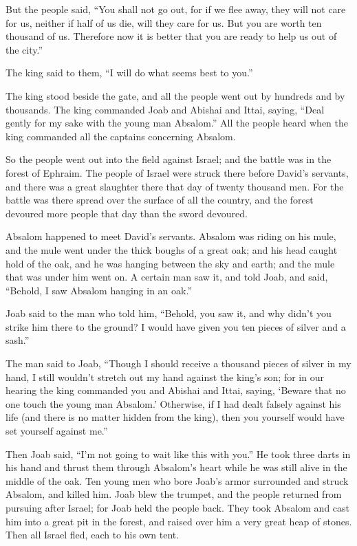  But the people said, ``You shall not go out, for if we flee
away, they will not care for us, neither if half of us die, will they
care for us. But you are worth ten thousand of us. Therefore now it is
better that you are ready to help us out of the city.''

 The king said to them, ``I will do what seems best to
you.''

The king stood beside the gate, and all the people went out by hundreds
and by thousands.  The king commanded Joab and Abishai and
Ittai, saying, ``Deal gently for my sake with the young man Absalom.''
All the people heard when the king commanded all the captains concerning
Absalom.

 So the people went out into the field against Israel; and
the battle was in the forest of Ephraim.  The people of
Israel were struck there before David's servants, and there was a great
slaughter there that day of twenty thousand men.  For the
battle was there spread over the surface of all the country, and the
forest devoured more people that day than the sword devoured.

 Absalom happened to meet David's servants. Absalom was
riding on his mule, and the mule went under the thick boughs of a great
oak; and his head caught hold of the oak, and he was hanging between the
sky and earth; and the mule that was under him went on.  A
certain man saw it, and told Joab, and said, ``Behold, I saw Absalom
hanging in an oak.''

 Joab said to the man who told him, ``Behold, you saw it,
and why didn't you strike him there to the ground? I would have given
you ten pieces of silver and a sash.''

 The man said to Joab, ``Though I should receive a thousand
pieces of silver in my hand, I still wouldn't stretch out my hand
against the king's son; for in our hearing the king commanded you and
Abishai and Ittai, saying, `Beware that no one touch the young man
Absalom.'  Otherwise, if I had dealt falsely against his
life (and there is no matter hidden from the king), then you yourself
would have set yourself against me.''

 Then Joab said, ``I'm not going to wait like this with
you.'' He took three darts in his hand and thrust them through Absalom's
heart while he was still alive in the middle of the oak. 
Ten young men who bore Joab's armor surrounded and struck Absalom, and
killed him.  Joab blew the trumpet, and the people returned
from pursuing after Israel; for Joab held the people back. 
They took Absalom and cast him into a great pit in the forest, and
raised over him a very great heap of stones. Then all Israel fled, each
to his own tent.

